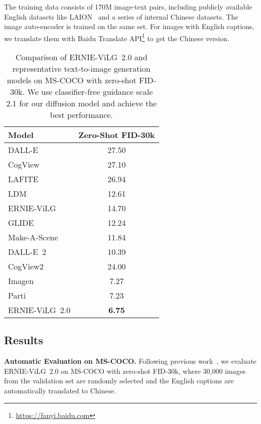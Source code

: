 \documentclass[10pt,twocolumn,letterpaper]{article}
\begin{document}
The training data consists of 170M image-text pairs, including publicly available English datasets like LAION~\cite{DBLP:journals/corr/abs-2111-02114} and a series of internal Chinese datasets. The image auto-encoder is trained on the same set. For images with English captions, we translate them with Baidu Translate API\footnote{\url{https://fanyi.baidu.com}} to get the Chinese version.


\begin{table}[t]
  \centering\small
  \caption{Comparison of ERNIE-ViLG~2.0 and representative text-to-image generation models on MS-COCO  with zero-shot FID-30k. We use classifier-free guidance scale 2.1 for our diffusion model and achieve the best performance.}
    \begin{tabular}{lc}
    \toprule
    \textbf{Model} & Zero-Shot FID-30k   \\
    \midrule
    DALL-E~\cite{DBLP:conf/icml/RameshPGGVRCS21}          & 27.50 \\
    CogView~\cite{DBLP:conf/nips/DingYHZZYLZSYT21}        & 27.10 \\ LAFITE~\cite{DBLP:journals/corr/abs-2111-13792}       & 26.94 \\
    LDM~\cite{DBLP:journals/corr/abs-2112-10752}          & 12.61 \\
    ERNIE-ViLG~\cite{DBLP:journals/corr/abs-2112-15283}   & 14.70 \\
    GLIDE~\cite{DBLP:conf/icml/NicholDRSMMSC22}           & 12.24 \\
    Make-A-Scene~\cite{DBLP:journals/corr/abs-2203-13131} & 11.84 \\
    DALL-E~2~\cite{DBLP:journals/corr/abs-2204-06125}     & 10.39 \\
    CogView2~\cite{DBLP:journals/corr/abs-2204-14217}     & 24.00 \\
    Imagen~\cite{DBLP:journals/corr/abs-2205-11487}       & 7.27 \\
    Parti~\cite{DBLP:journals/corr/abs-2206-10789}        & 7.23 \\
    \midrule
ERNIE-ViLG~2.0 & \textbf{6.75} \\
    \bottomrule
    \end{tabular}\label{tab:main}\end{table}

\subsection{Results}

\noindent\textbf{Automatic Evaluation on MS-COCO.}
Following previous work~\cite{DBLP:journals/corr/abs-2112-10752,DBLP:journals/corr/abs-2204-06125,DBLP:journals/corr/abs-2205-11487}, we evaluate ERNIE-ViLG~2.0 on MS-COCO  with zero-shot FID-30k, where 30,000 images from the validation set are randomly selected and the English captions are automatically translated to Chinese.
\end{document}
